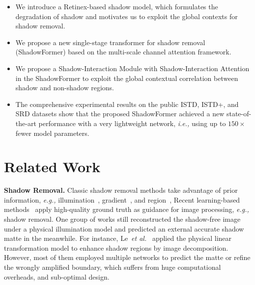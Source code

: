 \documentclass[letterpaper]{article} \usepackage{aaai23}  \usepackage{times}  \usepackage{helvet}  \usepackage{courier}  \usepackage[hyphens]{url}  \usepackage{graphicx} \urlstyle{rm} \def\UrlFont{\rm}  \usepackage{natbib}  \usepackage{caption} \frenchspacing  \setlength{\pdfpagewidth}{8.5in} \setlength{\pdfpageheight}{11in} \usepackage{algorithm}
\def\etal{\emph{et al.}}
\newcommand{\ie}{\textit{i.e., }}
\newcommand{\eg}{\textit{e.g., }}
\begin{document}
\begin{itemize}




    \item We introduce a Retinex-based shadow model, which formulates the degradation of shadow and motivates us to exploit the global contexts for shadow removal.
 


    \item We propose a new single-stage transformer for shadow removal (ShadowFormer) based on the multi-scale channel attention framework.
     
     \item We propose a Shadow-Interaction Module with Shadow-Interaction Attention in the ShadowFormer to exploit the global contextual correlation between shadow and non-shadow regions.


    \item The comprehensive experimental results on the public ISTD, ISTD+, and SRD datasets show that the proposed ShadowFormer achieved a new state-of-the-art performance with a very lightweight network, \ie using up to $150\times$ fewer model parameters.  

\end{itemize}


\section{Related Work}

\noindent
\textbf{Shadow Removal.}
Classic shadow removal methods take advantage of prior information, \eg illumination~\cite{zhang2015shadow}, gradient~\cite{gryka2015learning}, and region~\cite{guo2012paired,guo2022exploiting,guo2021self},
Recent learning-based methods~\cite{zhang2021rellie,guo2021fino,guo2021multi,guo2022enhancing} apply high-quality ground truth as guidance for image processing, \eg shadow removal. 
One group of works still reconstructed the shadow-free image under a physical illumination model and predicted an external accurate shadow matte in the meanwhile.
For instance, 
Le~\etal~\cite{le2019shadow} applied the physical linear transformation model to enhance shadow regions by image decomposition.
However, most of them employed multiple networks to predict the matte or refine the wrongly amplified boundary, which suffers from huge computational overheads, and sub-optimal design.
\end{document}
